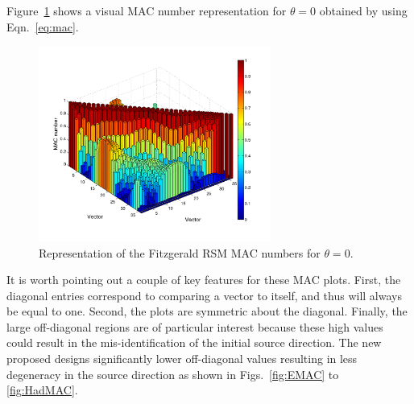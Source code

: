\documentclass[3p,times]{elsarticle}
\begin{document}
Figure~\ref{fig:RSMMAC} shows a visual MAC number representation for $\theta=0$ obtained by using Eqn.~\ref{eq:mac}. 
 
\begin{figure}[ht!]
\includegraphics[width={3.0in}]{../figs/RSMMAC.pdf}
\centering
\caption{Representation of the Fitzgerald RSM MAC numbers for $\theta=0$.}
\label{fig:RSMMAC}
\end{figure}

It is worth pointing out a couple of key features for these MAC plots. 
First, the diagonal entries correspond to comparing a vector to itself, and thus will always be equal to one.
Second, the plots are symmetric about the diagonal.  
Finally, the large off-diagonal regions are of particular interest because these high values could result in the mis-identification of the initial source direction. 
The new proposed designs significantly lower off-diagonal values resulting in less degeneracy in the source direction as shown in Figs.~\ref{fig:EMAC} to \ref{fig:HadMAC}.
\end{document}

